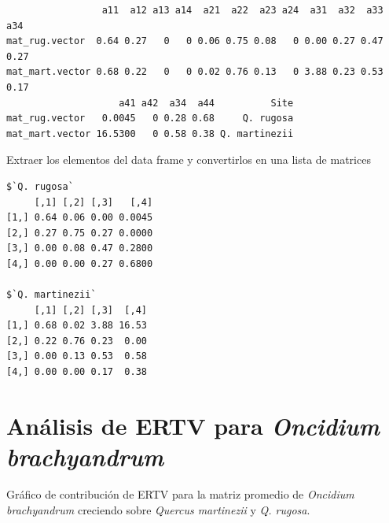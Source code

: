 \documentclass[
  12pt,
  letterpaper,
]{book}
\newenvironment{Shaded}{\begin{snugshade}}{\end{snugshade}}
\newcommand{\AttributeTok}[1]{\textcolor[rgb]{0.40,0.45,0.13}{#1}}
\newcommand{\ConstantTok}[1]{\textcolor[rgb]{0.56,0.35,0.01}{#1}}
\newcommand{\DecValTok}[1]{\textcolor[rgb]{0.68,0.00,0.00}{#1}}
\newcommand{\FunctionTok}[1]{\textcolor[rgb]{0.28,0.35,0.67}{#1}}
\newcommand{\NormalTok}[1]{\textcolor[rgb]{0.00,0.23,0.31}{#1}}
\newcommand{\OtherTok}[1]{\textcolor[rgb]{0.00,0.23,0.31}{#1}}
\newcommand{\SpecialCharTok}[1]{\textcolor[rgb]{0.37,0.37,0.37}{#1}}
\begin{document}
\begin{verbatim}
                 a11  a12 a13 a14  a21  a22  a23 a24  a31  a32  a33  a34
mat_rug.vector  0.64 0.27   0   0 0.06 0.75 0.08   0 0.00 0.27 0.47 0.27
mat_mart.vector 0.68 0.22   0   0 0.02 0.76 0.13   0 3.88 0.23 0.53 0.17
                    a41 a42  a34  a44          Site
mat_rug.vector   0.0045   0 0.28 0.68     Q. rugosa
mat_mart.vector 16.5300   0 0.58 0.38 Q. martinezii
\end{verbatim}

Extraer los elementos del data frame y convertirlos en una lista de
matrices

\begin{Shaded}
\end{Shaded}

\begin{verbatim}
$`Q. rugosa`
     [,1] [,2] [,3]   [,4]
[1,] 0.64 0.06 0.00 0.0045
[2,] 0.27 0.75 0.27 0.0000
[3,] 0.00 0.08 0.47 0.2800
[4,] 0.00 0.00 0.27 0.6800

$`Q. martinezii`
     [,1] [,2] [,3]  [,4]
[1,] 0.68 0.02 3.88 16.53
[2,] 0.22 0.76 0.23  0.00
[3,] 0.00 0.13 0.53  0.58
[4,] 0.00 0.00 0.17  0.38
\end{verbatim}

\section{\texorpdfstring{Análisis de ERTV para \emph{Oncidium
brachyandrum}}{Análisis de ERTV para Oncidium brachyandrum}}\label{anuxe1lisis-de-ertv-para-oncidium-brachyandrum}

Gráfico de contribución de ERTV para la matriz promedio de
\emph{Oncidium brachyandrum} creciendo sobre \emph{Quercus martinezii} y
\emph{Q. rugosa}.
\end{document}
